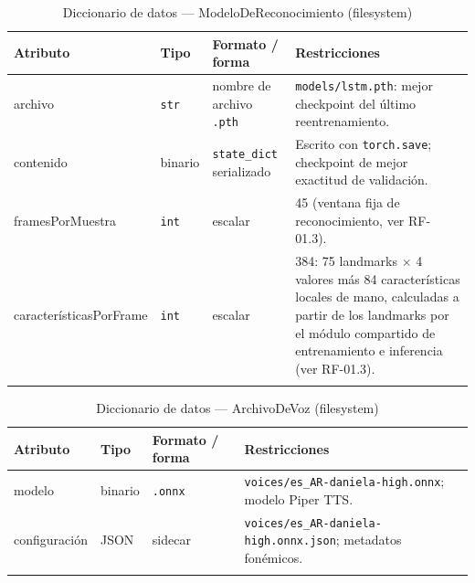 \begin{longtable}{p{2.8cm} p{2.2cm} p{3.2cm} p{5.6cm}}
    \toprule
    \textbf{Atributo} & \textbf{Tipo} & \textbf{Formato / forma} & \textbf{Restricciones} \\
    \midrule
    \endhead
    archivo & \texttt{str} & nombre de archivo \texttt{.pth} &
    \texttt{models/lstm.pth}: mejor checkpoint del último reentrenamiento. \\

    contenido & binario & \texttt{state\_dict} serializado &
    Escrito con \texttt{torch.save}; checkpoint de mejor exactitud de validación. \\

    frames\-Por\-Muestra & \texttt{int} & escalar &
    45 (ventana fija de reconocimiento, ver RF-01.3). \\

    caracterís\-ticas\-Por\-Frame & \texttt{int} & escalar &
    384: 75 landmarks $\times$ 4 valores más 84 características locales de
    mano, calculadas a partir de los landmarks por el módulo compartido de
    entrenamiento e inferencia (ver RF-01.3). \\
    \bottomrule
    \caption{Diccionario de datos — ModeloDeReconocimiento (filesystem)}
    \label{tab:dat-dic-modelo}
\end{longtable}

\begin{longtable}{p{2.8cm} p{2.2cm} p{3.2cm} p{5.6cm}}
    \toprule
    \textbf{Atributo} & \textbf{Tipo} & \textbf{Formato / forma} & \textbf{Restricciones} \\
    \midrule
    \endhead
    modelo & binario & \texttt{.onnx} &
    \texttt{voices/es\_AR-daniela-high.onnx}; modelo Piper TTS. \\

    configuración & JSON & sidecar &
    \texttt{voices/es\_AR-daniela-high.onnx.json}; metadatos fonémicos. \\
    \bottomrule
    \caption{Diccionario de datos — ArchivoDeVoz (filesystem)}
    \label{tab:dat-dic-voz}
\end{longtable}

